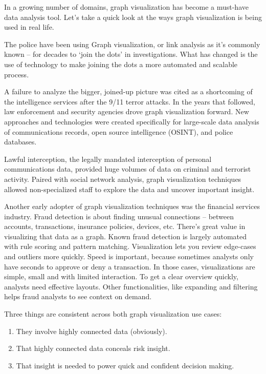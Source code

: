 \documentclass[]{book}
\providecommand{\tightlist}{%
  \setlength{\itemsep}{0pt}\setlength{\parskip}{0pt}}
\theoremstyle{definition}
\theoremstyle{definition}
\theoremstyle{definition}
\theoremstyle{remark}
\begin{document}
In a growing number of domains, graph visualization has become a
must-have data analysis tool. Let's take a quick look at the ways graph
visualization is being used in real life.

The police have been using Graph visualization, or link analysis as it's
commonly known -- for decades to `join the dots' in investigations. What
has changed is the use of technology to make joining the dots a more
automated and scalable process.

A failure to analyze the bigger, joined-up picture was cited as a
shortcoming of the intelligence services after the 9/11 terror attacks.
In the years that followed, law enforcement and security agencies drove
graph visualization forward. New approaches and technologies were
created specifically for large-scale data analysis of communications
records, open source intelligence (OSINT), and police databases.

Lawful interception, the legally mandated interception of personal
communications data, provided huge volumes of data on criminal and
terrorist activity. Paired with social network analysis, graph
visualization techniques allowed non-specialized staff to explore the
data and uncover important insight.

Another early adopter of graph visualization techniques was the
financial services industry. Fraud detection is about finding unusual
connections -- between accounts, transactions, insurance policies,
devices, etc. There's great value in visualizing that data as a graph.
Known fraud detection is largely automated with rule scoring and pattern
matching. Visualization lets you review edge-cases and outliers more
quickly. Speed is important, because sometimes analysts only have
seconds to approve or deny a transaction. In those cases, visualizations
are simple, small and with limited interaction. To get a clear overview
quickly, analysts need effective layouts. Other functionalities, like
expanding and filtering helps fraud analysts to see context on demand.

Three things are consistent across both graph visualization use cases:

\begin{enumerate}
\def\labelenumi{\arabic{enumi}.}
\tightlist
\item
  They involve highly connected data (obviously).
\item
  That highly connected data conceals risk insight.
\item
  That insight is needed to power quick and confident decision making.
\end{enumerate}
\end{document}
